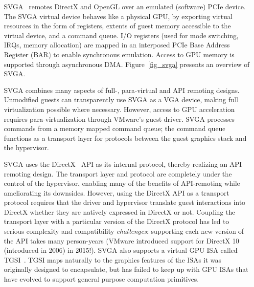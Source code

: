 SVGA~\cite{dowty2009gpu} remotes DirectX and OpenGL over an emulated (software) PCIe device.
The SVGA virtual device behaves like a physical GPU, by exporting virtual resources
in the form of registers, extents of guest memory accessible to the virtual device,
and a command queue.
I/O registers (used for mode switching, IRQs, memory allocation) are mapped
in an interposed PCIe Base Address Register (BAR) to enable synchronous emulation.
Access to GPU memory is supported through asynchronous DMA.
Figure~\ref{fig_svga} presents an overview of SVGA.

SVGA combines many aspects of full-, para-virtual and API remoting designs.
Unmodified guests can transparently use SVGA as a VGA device, making full
virtualization possible where necessary. However, access to GPU acceleration
requires para-virtualization through VMware's guest driver.
SVGA processes commands from a memory mapped command queue;
the command queue functions as a transport layer for protocols
between the guest graphics stack and the hypervisor.

SVGA uses the DirectX~\cite{directX} API as its internal protocol, thereby
realizing an API-remoting design. The transport layer and protocol are
completely under the control of the hypervisor, enabling many of the benefits
of API-remoting while ameliorating its downsides. However, using the DirectX
API as a transport protocol requires that
the driver and hypervisor translate guest interactions into DirectX
whether they are natively expressed in DirectX or not.
Coupling the transport layer with a particular version of the DirectX protocol has led to
serious complexity and compatibility \textit{challenges}: supporting each new version of the API
takes many person-years (VMware introduced support for DirectX 10 (introduced in 2006)
in 2015!).
SVGA also supports a virtual GPU ISA called TGSI~\cite{tgsi}.
TGSI maps naturally to the graphics features of the ISAs it was
originally designed to encapsulate, but has failed to keep up with
GPU ISAs that have evolved to support general purpose computation primitives.


